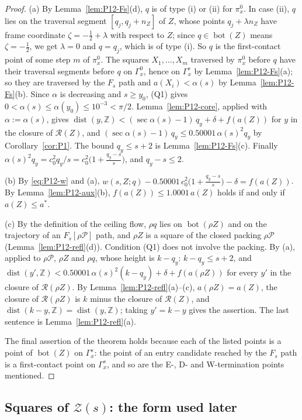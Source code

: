\documentclass[11pt]{amsart}
\newcommand{\Z}{\mathbb Z}
\newcommand{\cP}{\mathcal P}
\newcommand{\cR}{\mathcal R}
\newcommand{\cZ}{\mathcal Z}
\newcommand{\Bot}{\operatorname{bot}}
\newcommand{\dist}{\operatorname{dist}}
\newcommand{\Fs}{F_{s}}
\theoremstyle{definition}
\theoremstyle{remark}
\numberwithin{equation}{section}
\begin{document}
\begin{proof}
(a) By Lemma~\ref{lem:P12-Fs}(d), $q$ is of type (i) or (ii) for $\pi^0_x$. In case (ii), $q$ lies on the traversal segment $[q_j,q_j+n_Z]$ of $Z$, whose points $q_j+\lambda n_Z$ have frame coordinate $\zeta=-\frac12+\lambda$ with respect to $Z$; since $q\in\Bot(Z)$ means $\zeta=-\frac12$, we get $\lambda=0$ and $q=q_j$, which is of type (i). So $q$ is the first-contact point of some step $m$ of $\pi^0_x$. The squares $X_1,\dots,X_m$ traversed by $\pi^0_x$ before $q$ have their traversal segments before $q$ on $\Gamma^0_x$, hence on $\Gamma^s_x$ by Lemma~\ref{lem:P12-Fs}(a); so they are traversed by the $\Fs$ path and $a(X_i)<\alpha(s)$ by Lemma~\ref{lem:P12-Fs}(b). Since $\alpha$ is decreasing and $s\ge y_0$, (Q1) gives $0<\alpha(s)\le\alpha(y_0)\le10^{-3}<\pi/2$. Lemma~\ref{lem:P12-core}, applied with $\alpha:=\alpha(s)$, gives $\dist(y,\Z)<(\sec\alpha(s)-1)\,q_y+\delta+f(a(Z))$ for $y$ in the closure of $\cR(Z)$, and $(\sec\alpha(s)-1)\,q_y\le0.50001\,\alpha(s)^2q_y$ by Corollary~\ref{cor:P1}. The bound $q_y\le s+2$ is Lemma~\ref{lem:P12-Fs}(c). Finally $\alpha(s)^2q_y=c_0^2q_y/s=c_0^2\bigl(1+\frac{q_y-s}s\bigr)$, and $q_y-s\le2$.

(b) By \eqref{eq:P12-w} and (a), $w(s,Z;q)-0.50001\,c_0^2\bigl(1+\frac{q_y-s}s\bigr)-\delta=f(a(Z))$. By Lemma~\ref{lem:P12-aux}(b), $f(a(Z))\le1.0001\,a(Z)$ holds if and only if $a(Z)\le a^*$.

(c) By the definition of the ceiling flow, $\rho q$ lies on $\Bot(\rho Z)$ and on the trajectory of an $\Fs[\rho\cP]$ path, and $\rho Z$ is a square of the closed packing $\rho\cP$ (Lemma~\ref{lem:P12-refl}(d)). Condition (Q1) does not involve the packing. By (a), applied to $\rho\cP$, $\rho Z$ and $\rho q$, whose height is $k-q_y$: $k-q_y\le s+2$, and $\dist(y',\Z)<0.50001\,\alpha(s)^2(k-q_y)+\delta+f(a(\rho Z))$ for every $y'$ in the closure of $\cR(\rho Z)$. By Lemma~\ref{lem:P12-refl}(a)--(c), $a(\rho Z)=a(Z)$, the closure of $\cR(\rho Z)$ is $k$ minus the closure of $\cR(Z)$, and $\dist(k-y,\Z)=\dist(y,\Z)$; taking $y'=k-y$ gives the assertion. The last sentence is Lemma~\ref{lem:P12-refl}(a).

The final assertion of the theorem holds because each of the listed points is a point of $\Bot(Z)$ on $\Gamma^s_x$: the point of an entry candidate reached by the $\Fs$ path is a first-contact point on $\Gamma^s_x$, and so are the E-, D- and W-termination points mentioned.
\end{proof}

\subsection{Squares of \texorpdfstring{$\cZ(s)$}{Z(s)}: the form used later}\label{ssec:P12-Z}
\end{document}
